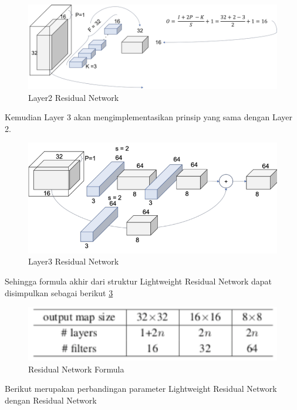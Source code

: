 \begin{figure}[h!]
	\centering
	\includegraphics[scale=0.3]{img/layer2.png}
	\caption{Layer2 Residual Network}
	\label{fig:ResnetLayer2}
\end{figure}


Kemudian Layer 3 akan mengimplementasikan prinsip yang sama dengan Layer 2.

\begin{figure}[h!]
	\centering
	\includegraphics[scale=0.3]{img/layer3.png}
	\caption{Layer3 Residual Network}
	\label{fig:ResnetLayer3}
\end{figure}

\pagebreak

Sehingga formula akhir dari struktur Lightweight Residual Network dapat disimpulkan sebagai berikut \ref{fig:ResnetLayerFormula}

\begin{figure}[h!]
	\centering
	\includegraphics[scale=0.4]{img/ResNetFormula.png}
	\caption{Residual Network Formula}
	\label{fig:ResnetLayerFormula}
\end{figure}

Berikut merupakan perbandingan parameter Lightweight Residual Network dengan Residual Network

